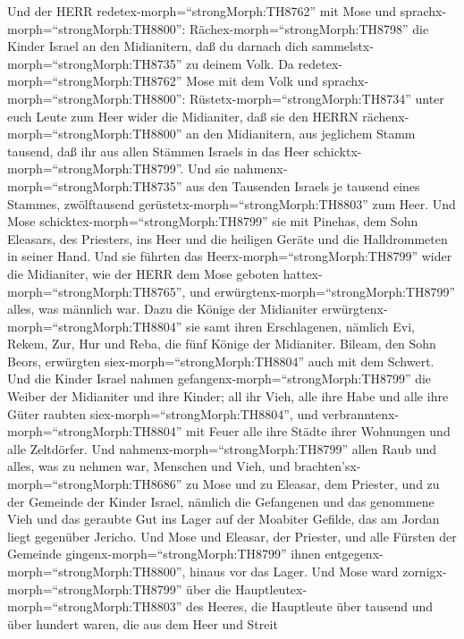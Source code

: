  Und der HERR redetex-morph=``strongMorph:TH8762'' mit Mose
und sprachx-morph=``strongMorph:TH8800'': 
Rächex-morph=``strongMorph:TH8798'' die Kinder Israel an den
Midianitern, daß du darnach dich sammelstx-morph=``strongMorph:TH8735''
zu deinem Volk.  Da redetex-morph=``strongMorph:TH8762''
Mose mit dem Volk und sprachx-morph=``strongMorph:TH8800'':
Rüstetx-morph=``strongMorph:TH8734'' unter euch Leute zum Heer wider die
Midianiter, daß sie den HERRN rächenx-morph=``strongMorph:TH8800'' an
den Midianitern,  aus jeglichem Stamm tausend, daß ihr aus
allen Stämmen Israels in das Heer schicktx-morph=``strongMorph:TH8799''.
 Und sie nahmenx-morph=``strongMorph:TH8735'' aus den
Tausenden Israels je tausend eines Stammes, zwölftausend
gerüstetx-morph=``strongMorph:TH8803'' zum Heer.  Und Mose
schicktex-morph=``strongMorph:TH8799'' sie mit Pinehas, dem Sohn
Eleasars, des Priesters, ins Heer und die heiligen Geräte und die
Halldrommeten in seiner Hand.  Und sie führten das
Heerx-morph=``strongMorph:TH8799'' wider die Midianiter, wie der HERR
dem Mose geboten hattex-morph=``strongMorph:TH8765'', und
erwürgtenx-morph=``strongMorph:TH8799'' alles, was männlich war.
 Dazu die Könige der Midianiter
erwürgtenx-morph=``strongMorph:TH8804'' sie samt ihren Erschlagenen,
nämlich Evi, Rekem, Zur, Hur und Reba, die fünf Könige der Midianiter.
Bileam, den Sohn Beors, erwürgten siex-morph=``strongMorph:TH8804'' auch
mit dem Schwert.  Und die Kinder Israel nahmen
gefangenx-morph=``strongMorph:TH8799'' die Weiber der Midianiter und
ihre Kinder; all ihr Vieh, alle ihre Habe und alle ihre Güter raubten
siex-morph=``strongMorph:TH8804'',  und
verbranntenx-morph=``strongMorph:TH8804'' mit Feuer alle ihre Städte
ihrer Wohnungen und alle Zeltdörfer.  Und
nahmenx-morph=``strongMorph:TH8799'' allen Raub und alles, was zu nehmen
war, Menschen und Vieh,  und
brachten'sx-morph=``strongMorph:TH8686'' zu Mose und zu Eleasar, dem
Priester, und zu der Gemeinde der Kinder Israel, nämlich die Gefangenen
und das genommene Vieh und das geraubte Gut ins Lager auf der Moabiter
Gefilde, das am Jordan liegt gegenüber Jericho.  Und Mose
und Eleasar, der Priester, und alle Fürsten der Gemeinde
gingenx-morph=``strongMorph:TH8799'' ihnen
entgegenx-morph=``strongMorph:TH8800'', hinaus vor das Lager.
 Und Mose ward zornigx-morph=``strongMorph:TH8799'' über
die Hauptleutex-morph=``strongMorph:TH8803'' des Heeres, die Hauptleute
über tausend und über hundert waren, die aus dem Heer und Streit
